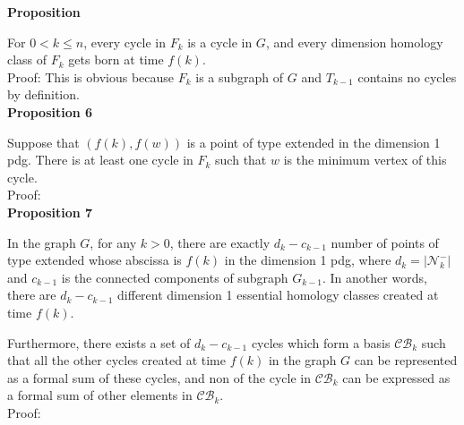 \documentclass[a4paper,12pt]{article}
\numberwithin{equation}{section}
\begin{document}
	
	
	
	
	
	
	\noindent \textbf{Proposition } 
	
	For $0 < k \leq n$, every cycle in $F_k$ is a cycle in $G$, and every dimension homology class of $F_k$ gets born at time $f(k)$.\\
	
	\noindent Proof: This is obvious because $F_k$ is a subgraph of $G$ and $T_{k-1}$ contains no cycles by definition.\\
	
	
	\noindent \textbf{Proposition 6}
	
	Suppose that $(f(k), f(w))$ is a point of type extended in the dimension 1 pdg. There is at least one cycle in $F_k$ such that $w$ is the minimum vertex of this cycle.\\
	
	\noindent Proof:\\
	
	\noindent \textbf{Proposition 7}
	
	In the graph $G$, for any $k>0$, there are exactly $d_k - c_{k-1}$ number of points of type extended whose abscissa is $f(k)$ in the dimension 1 pdg, where $d_k = \vert \mathcal{N}^-_{k} \vert$ and $c_{k-1}$ is the connected components of subgraph $G_{k-1}$. In another words, there are $d_k - c_{k-1}$ different dimension 1 essential homology classes created at time $f(k)$.
	
	Furthermore, there exists a set of $d_k - c_{k-1}$ cycles which form a basis $\mathcal{CB}_k$ such that all the other cycles created at time $f(k)$ in the graph $G$ can be represented as a formal sum of these cycles, and non of the cycle in $\mathcal{CB}_k$ can be expressed as a formal sum of other elements in $\mathcal{CB}_k$.\\
	
	\noindent Proof:\\
	
\end{document}
